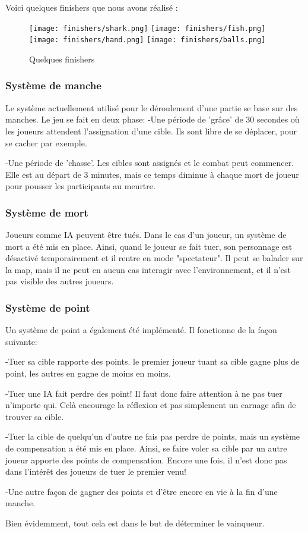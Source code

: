 Voici quelques finishers que nous avons réalisé :

\begin{figure}[hbt!]
    \centering
    \texttt{[image: finishers/shark.png]}
	\texttt{[image: finishers/fish.png]}
	\texttt{[image: finishers/hand.png]}
	\texttt{[image: finishers/balls.png]}
    \caption{Quelques finishers}
\end{figure}
\FloatBarrier


\subsubsection{Système de manche}
    Le système actuellement utilisé pour le déroulement d'une partie se base sur des manches. Le jeu se fait en deux phase:
    	-Une période de 'grâce' de 30 secondes où les joueurs attendent l'assignation d'une cible. 
	 Ils sont libre de se déplacer, pour se cacher par exemple.

	-Une période de 'chasse'. Les cibles sont assignés et le combat peut commencer. Elle est au départ de 3 minutes, mais ce temps
	 diminue à chaque mort de joueur pour pousser les participants au meurtre.

\subsubsection{Système de mort}
    Joueurs comme IA peuvent être tués. Dans le cas d'un joueur, un système de mort a été mis en place. Ainsi,
    quand le joueur se fait tuer, son personnage est désactivé temporairement et il rentre
    en mode "spectateur". Il peut se balader sur la map, mais il ne peut en aucun cas interagir avec l'environnement,
	et il n'est pas visible des autres joueurs.

\subsubsection{Système de point}
    Un système de point a également été implémenté. Il fonctionne de la façon suivante:
    
	-Tuer sa cible rapporte des points. le premier joueur tuant sa cible gagne plus de point, les autres en gagne de moins en moins.
	
	-Tuer une IA fait perdre des point! Il faut donc faire attention à ne pas tuer n'importe qui. Celà encourage la réflexion et pas 	 simplement un carnage afin de trouver sa cible.
	
	-Tuer la cible de quelqu'un d'autre ne fais pas perdre de points, mais un système de compensation a été mis en place. Ainsi, se 	faire voler sa cible par un autre joueur apporte des points de compensation. Encore une fois, il n'est donc pas dans l'intérêt 
	des joueurs de tuer le premier venu!

	-Une autre façon de gagner des points et d'être encore en vie à la fin d'une manche.

    Bien évidemment, tout cela est dans le but de déterminer le vainqueur.
